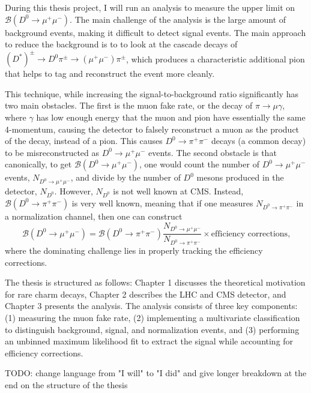 During this thesis project, I will run an analysis to measure the upper limit on $\mathcal{B}(D^0 \to \mu^+ \mu^-)$. The main challenge of the analysis is the large amount of background events, making it difficult to detect signal events. The main approach to reduce the background is to to look at the cascade decays of $(D^*)^\pm \to D^0 \pi^\pm \to (\mu^+ \mu^-) \pi^\pm$, which produces a characteristic additional pion that helps to tag and reconstruct the event more cleanly. 

This technique, while increasing the signal-to-background ratio significantly has two main obstacles. The first is the muon fake rate, or the decay of $\pi \to \mu \gamma$, where $\gamma$ has low enough energy that the muon and pion have essentially the same 4-momentum, causing the detector to falsely reconstruct a muon as the product of the decay, instead of a pion. This causes $D^0 \to \pi^+ \pi^-$ decays (a common decay) to be misreconstructed as $D^0 \to \mu^+ \mu^-$ events. The second obstacle is that canonically, to get $\mathcal{B}(D^0 \to \mu^+ \mu^-)$, one would count the number of $D^0 \to \mu^+ \mu^-$ events, $N_{D^0 \to \mu^+ \mu^-}$, and divide by the number of $D^0$ mesons produced in the detector, $N_{D^0}$. However, $N_{D^0}$ is not well known at CMS. Instead, $\mathcal{B}(D^0 \to \pi^+ \pi^-)$ is very well known, meaning that if one measures $N_{D^0 \to \pi^+ \pi^-}$ in a normalization channel, then one can construct
$$
\mathcal{B}(D^0 \to \mu^+ \mu^-) = \mathcal{B}(D^0 \to \pi^+ \pi^-) \frac{N_{D^0 \to \mu^+ \mu^-}}{N_{D^0 \to \pi^+ \pi^-}} \times \text{efficiency corrections,}
$$
where the dominating challenge lies in properly tracking the efficiency corrections. 

The thesis is structured as follows: Chapter 1 discusses the theoretical motivation for rare charm decays, Chapter 2 describes the LHC and CMS detector, and Chapter 3 presents the analysis. The analysis consists of three key components: (1) measuring the muon fake rate, (2) implementing a multivariate classification to distinguish background, signal, and normalization events, and (3) performing an unbinned maximum likelihood fit to extract the signal while accounting for efficiency corrections.

TODO: change language from "I will" to "I did" and give longer breakdown at the end on the structure of the thesis